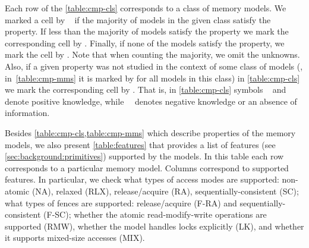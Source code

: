 Each row of the \cref{table:cmp-cls} corresponds to a class of memory models. 
We marked a cell by \cmark~ if the majority of models 
in the given class satisfy the property. 
If less than the majority of models satisfy the property we mark 
the corresponding cell by \wmark.
Finally, if none of the models satisfy the property, we mark the cell by \xmark. 
Note that when counting the majority, we omit the unknowns.
Also, if a given property was not studied in the context of some class of models 
(\ie, in~\cref{table:cmp-mms} it is marked by \qmark for all models in this class)
in \cref{table:cmp-cls} we mark the corresponding cell by \xmark. 
That is, in \cref{table:cmp-cls} symbols \cmark~ and \wmark~ 
denote positive knowledge,
while~\xmark~ denotes negative knowledge or
an absence of information.

Besides \cref{table:cmp-cls,table:cmp-mms} which describe 
properties of the memory models, 
we also present \cref{table:features}
that provides a list of features (see \cref{sec:background:primitives}) 
supported by the models.
In this table each row corresponds to a particular memory model. 
Columns correspond to supported features. 
In particular, we check what types of access modes are supported:
non-atomic (NA), relaxed (RLX), release/acquire (RA), sequentially-consistent (SC); 
what types of fences are supported: release/acquire (F-RA) 
and sequentially-consistent (F-SC);
whether the atomic read-modify-write operations are supported (RMW),
whether the model handles locks explicitly (LK),
and whether it supports mixed-size accesses (MIX). 

